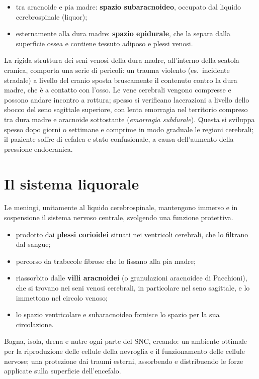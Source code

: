 \begin{itemize}
  \item tra aracnoide e pia madre: \textbf{spazio subaracnoideo}, occupato
    dal liquido cerebrospinale (liquor);
  \item esternamente alla dura madre: \textbf{spazio epidurale}, che la
    separa dalla superficie ossea e contiene tessuto adiposo e plessi
    venosi.
\end{itemize}

La rigida struttura dei seni venosi della dura madre, all'interno della
scatola cranica, comporta una serie di pericoli: un trauma violento (es.\
incidente stradale) a livello del cranio sposta bruscamente il contenuto
contro la dura madre, che è a contatto con l'osso. Le vene cerebrali vengono
compresse e possono andare incontro a rottura; spesso si verificano
lacerazioni a livello dello sbocco del seno sagittale superiore, con lenta
emorragia nel territorio compreso tra dura madre e aracnoide sottostante
(\textit{emorragia subdurale}). Questa si sviluppa spesso dopo giorni o
settimane e comprime in modo graduale le regioni cerebrali; il paziente
soffre di cefalea e stato confusionale, a causa dell'aumento della pressione
endocranica.

\section{Il sistema liquorale}

Le meningi, unitamente al liquido cerebrospinale, mantengono immerso e in
sospensione il sistema nervoso centrale, svolgendo una funzione protettiva.

\begin{itemize}
  \item prodotto dai \textbf{plessi corioidei} situati nei ventricoli
    cerebrali, che lo filtrano dal sangue;
  \item percorso da trabecole fibrose che lo fissano alla pia madre;
  \item riassorbito dalle \textbf{villi aracnoidei} (o granulazioni
    aracnoidee di Pacchioni), che si trovano nei seni venosi cerebrali, in
    particolare nel seno sagittale, e lo immettono nel circolo venoso;
  \item lo spazio ventricolare e subaracnoideo fornisce lo spazio per la sua
    circolazione.
\end{itemize}
Bagna, isola, drena e nutre ogni parte del SNC, creando: un ambiente
ottimale per la riproduzione delle cellule della nevroglia e il
funzionamento delle cellule nervose; una protezione dai traumi esterni,
assorbendo e distribuendo le forze applicate sulla superficie dell'encefalo.

